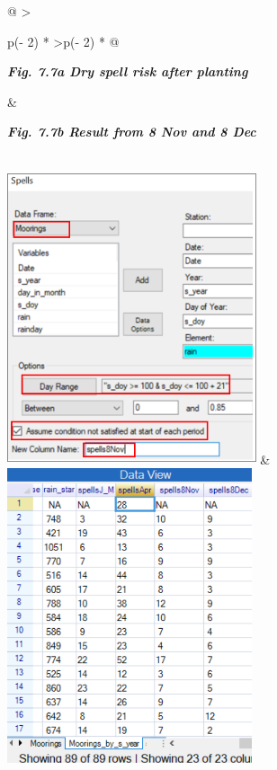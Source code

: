\documentclass[
  letterpaper,
  DIV=11,
  numbers=noendperiod]{scrreprt}
\begin{document}
\begin{longtable}[]{@{}
  >{\raggedright\arraybackslash}p{(\columnwidth - 2\tabcolsep) * }
  >{\centering\arraybackslash}p{(\columnwidth - 2\tabcolsep) * }@{}}
\toprule\noalign{}
\begin{minipage}[b]{\linewidth}\raggedright
\textbf{\emph{Fig. 7.7a Dry spell risk after planting}}
\end{minipage} & \begin{minipage}[b]{\linewidth}\centering
\textbf{\emph{Fig. 7.7b Result from 8 Nov and 8 Dec}}
\end{minipage} \\
\midrule\noalign{}
\endhead
\bottomrule\noalign{}
\endlastfoot
\includegraphics[width=2.88158in,height=3.39374in]{figures/Fig7.7a.png}
&
\includegraphics[width=2.83089in,height=3.41229in]{figures/Fig7.7b.png} \\
\end{longtable}
\end{document}
